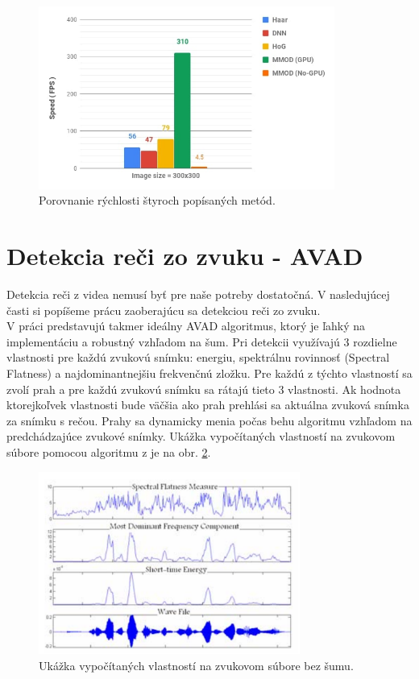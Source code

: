 \begin{figure}[H]
	\begin{center}
		\includegraphics[height=6cm]{pics/face-detection-speed-comparison.jpg}
		\caption{Porovnanie rýchlosti štyroch popísaných metód.
		 \cite{OpenCVvsDlib}}
		\label{pic-face-detection-speed-comparison}
	\end{center}
\end{figure}

\section{Detekcia reči zo zvuku - AVAD}
Detekcia reči z videa nemusí byť pre naše potreby dostatočná. V nasledujúcej časti si popíšeme prácu zaoberajúcu sa detekciou reči zo zvuku.\\

V práci \cite{moattar2009simple} predstavujú takmer ideálny AVAD algoritmus, ktorý je ľahký na implementáciu a robustný vzhľadom na šum.
Pri detekcii využívajú 3 rozdielne vlastnosti pre každú zvukovú snímku: energiu, spektrálnu rovinnosť (Spectral Flatness) a najdominantnejšiu frekvenčnú zložku.
Pre každú z týchto vlastností sa zvolí prah a pre každú zvukovú snímku sa rátajú tieto 3 vlastnosti.
Ak hodnota ktorejkoľvek vlastnosti bude väčšia ako prah prehlási sa aktuálna zvuková snímka za snímku s rečou.
Prahy sa dynamicky menia počas behu algoritmu vzhľadom na predchádzajúce zvukové snímky.
Ukážka vypočítaných vlastností na zvukovom súbore pomocou algoritmu z \cite{moattar2009simple} je na obr. \ref{pic-avad}.

\begin{figure}[H]
	\begin{center}
		\includegraphics[height=6cm]{pics/avad.png}
		\caption{Ukážka vypočítaných vlastností na zvukovom súbore bez šumu.
		 \cite{moattar2009simple}}
		\label{pic-avad}
	\end{center}
\end{figure}

